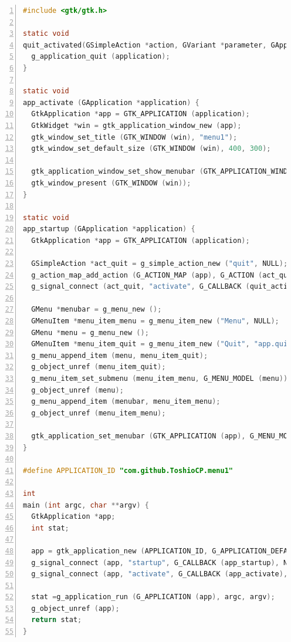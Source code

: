\begin{lstlisting}[language=C, numbers=left]
#include <gtk/gtk.h>

static void
quit_activated(GSimpleAction *action, GVariant *parameter, GApplication *application) {
  g_application_quit (application);
}

static void
app_activate (GApplication *application) {
  GtkApplication *app = GTK_APPLICATION (application);
  GtkWidget *win = gtk_application_window_new (app);
  gtk_window_set_title (GTK_WINDOW (win), "menu1");
  gtk_window_set_default_size (GTK_WINDOW (win), 400, 300);

  gtk_application_window_set_show_menubar (GTK_APPLICATION_WINDOW (win), TRUE);
  gtk_window_present (GTK_WINDOW (win));
}

static void
app_startup (GApplication *application) {
  GtkApplication *app = GTK_APPLICATION (application);

  GSimpleAction *act_quit = g_simple_action_new ("quit", NULL);
  g_action_map_add_action (G_ACTION_MAP (app), G_ACTION (act_quit));
  g_signal_connect (act_quit, "activate", G_CALLBACK (quit_activated), application);

  GMenu *menubar = g_menu_new ();
  GMenuItem *menu_item_menu = g_menu_item_new ("Menu", NULL);
  GMenu *menu = g_menu_new ();
  GMenuItem *menu_item_quit = g_menu_item_new ("Quit", "app.quit");
  g_menu_append_item (menu, menu_item_quit);
  g_object_unref (menu_item_quit);
  g_menu_item_set_submenu (menu_item_menu, G_MENU_MODEL (menu));
  g_object_unref (menu);
  g_menu_append_item (menubar, menu_item_menu);
  g_object_unref (menu_item_menu);

  gtk_application_set_menubar (GTK_APPLICATION (app), G_MENU_MODEL (menubar));
}

#define APPLICATION_ID "com.github.ToshioCP.menu1"

int
main (int argc, char **argv) {
  GtkApplication *app;
  int stat;

  app = gtk_application_new (APPLICATION_ID, G_APPLICATION_DEFAULT_FLAGS);
  g_signal_connect (app, "startup", G_CALLBACK (app_startup), NULL);
  g_signal_connect (app, "activate", G_CALLBACK (app_activate), NULL);

  stat =g_application_run (G_APPLICATION (app), argc, argv);
  g_object_unref (app);
  return stat;
}
\end{lstlisting}

